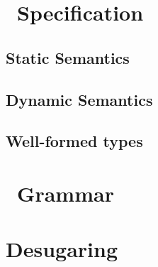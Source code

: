 \section{\lang\ Specification}

%
\subsection{Static Semantics}\label{subsec:static_sem}
\ottdefnsTypes%

\subsection{Dynamic Semantics}\label{subsec:dyn_sem}
\ottdefnsOpXXSem%







\subsection{Well-formed types}
\ottdefnsWellXXFormed%

\section{\lang\ Grammar}\label{sec:grammar_def}
\ottgrammar%

\section{Desugaring \lang}\label{sec:lang_desugar}

